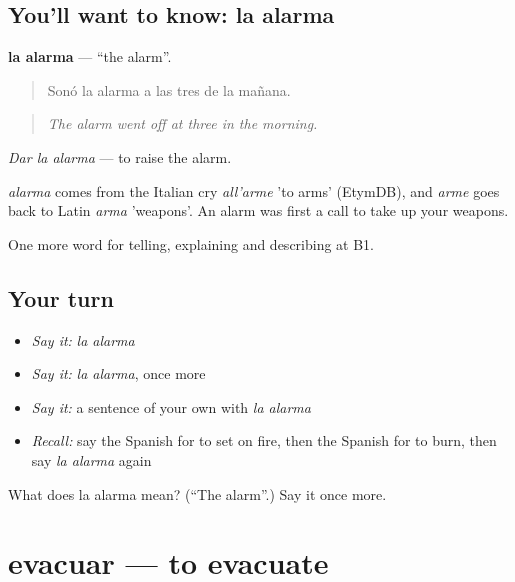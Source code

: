 \subsection*{You'll want to know: la alarma}
\textbf{la alarma} — \textquotedblleft{}the alarm\textquotedblright{}.

\begin{quote}
Sonó la alarma a las tres de la mañana.
\end{quote}

\begin{quote}
\emph{The alarm went off at three in the morning.}
\end{quote}

\emph{Dar la alarma} — to raise the alarm.

\begin{cousinweb}
\emph{alarma} comes from the Italian cry \emph{all'arme} 'to arms' (EtymDB), and \emph{arme} goes back to Latin \emph{arma} 'weapons'. An alarm was first a call to take up your weapons.
\end{cousinweb}

\begin{grammarlens}[title={What you've built}]
One more word for telling, explaining and describing at B1.
\end{grammarlens}

\subsection*{Your turn}
\begin{itemize}
\raggedright
  \item \emph{Say it:} \emph{la alarma}
  \item \emph{Say it:} \emph{la alarma}, once more
  \item \emph{Say it:} a sentence of your own with \emph{la alarma}
  \item \emph{Recall:} say the Spanish for to set on fire, then the Spanish for to burn, then say \emph{la alarma} again
\end{itemize}

\begin{tcolorbox}[breakable,colback=teal!4,colframe=teal!35!black,title={Before you move on}]
What does la alarma mean? (\textquotedblleft{}The alarm\textquotedblright{}.) Say it once more.
\end{tcolorbox}
\section[evacuar]{evacuar — to evacuate}

